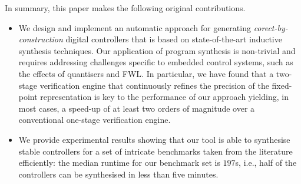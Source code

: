 \documentclass{sig-alternate-05-2015}
\begin{document}
In summary, this paper makes the following original contributions.
%
\begin{itemize}

\item We design and implement an automatic approach for generating
  {\em corect-by-construction} digital controllers that is based on
  state-of-the-art inductive synthesis techniques.  Our application of
  program synthesis is non-trivial and requires addressing challenges
  specific to embedded control systems, such as the effects of quantisers and
  FWL. In particular, we have found that a two-stage verification engine
  that continuously refines the precision of the fixed-point
  representation is key to the performance of our approach yielding,
  in most cases, a speed-up of at least two orders of magnitude over a
  conventional one-stage verification engine.

\item We provide experimental results showing that our tool is able to
synthesise stable controllers for a set of intricate benchmarks taken from
the literature efficiently: the median runtime for our benchmark set is
$197$s, i.e., half of the controllers can be synthesised in less than five
minutes.




\end{itemize}


\end{document}

